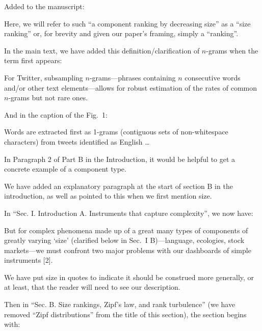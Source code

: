 Added to the manuscript:
\begin{excerpt}
  Here, we will refer to such
  ``a component ranking by decreasing size'' as a ``size ranking''
  or, for brevity and given our paper's framing, simply a ``ranking''.
\end{excerpt}

In the main text, we have added this definition/clarification of $n$-grams when the term first appears:

\begin{excerpt}
  For Twitter, subsampling $n$-grams---phrases containing $n$ consecutive words and/or other text elements---allows for robust estimation of the rates of common $n$-grams but not rare ones.
\end{excerpt}

And in the caption of the Fig.~1:

\begin{excerpt}
  Words are extracted first as 1-grams (contiguous sets of non-whitespace characters)
  from tweets identified as English \ldots
\end{excerpt}


\begin{reviewercomment}
  In Paragraph 2 of Part B in the Introduction, it would be helpful to
  get a concrete example of a component type.
\end{reviewercomment}

We have added an explanatory paragraph at the start of section B in the introduction,
as well as pointed to this when we first mention size.

In ``Sec. I. Introduction A. Instruments that capture complexity'', we now have:
\begin{excerpt}
  But for complex phenomena made up of
  a great many types of components
  of greatly varying `size'
  (clarified below in Sec.~I B)---language, ecologies,
  stock markets---we
  must confront two major problems with our dashboards of simple instruments [2].
\end{excerpt}
We have put size in quotes to indicate it should be construed more generally, or at least,
that the reader will need to see our description.

Then in ``Sec. B. Size rankings, Zipf’s law, and rank turbulence'' (we have removed ``Zipf distributions'' from the title of this section), the section begins with:

